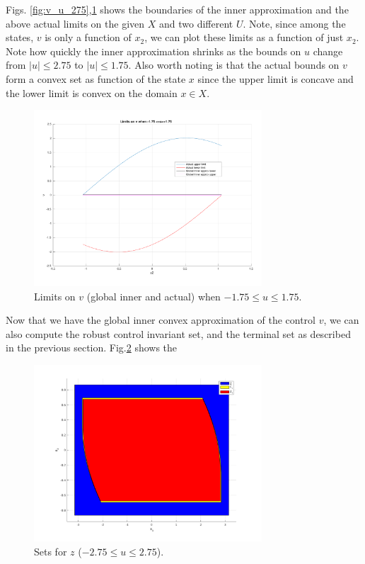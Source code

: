 \documentclass{article}[14pt]
\begin{document}
Figs. \ref{fig:v_u_275},\ref{fig:v_u_175} shows the boundaries of the inner approximation and the above actual limits on  the given $X$ and two different $U$. Note, since among the states, $v$ is only a function of $x_2$, we can plot these limits as a function of just $x_2$. Note how quickly the inner approximation shrinks as the bounds on $u$ change from $|u|\leq2.75$ to $|u|\leq1.75$. Also worth noting is that the actual bounds on $v$ form a convex set as function of the state $x$ since the upper limit is concave and the lower limit is convex on the domain $x\in X$.

\begin{figure}[tb]
	\centering
	\includegraphics[width=0.76\textwidth]{Figs/v_u_175.pdf}
	\vspace{-10pt}
	\caption{Limits on $v$ (global inner and actual) when $-1.75\leq u \leq 1.75$.}
	\label{fig:v_u_175}%
\end{figure} 

Now that we have the global inner convex approximation of the control $v$, we can also compute the robust control invariant set, and the terminal set as described in the previous section. Fig.\ref{fig:Z_states} shows the 

\begin{figure}[tb]
	\centering
	\includegraphics[width=0.76\textwidth]{Figs/Z_states.pdf}
	\vspace{-10pt}
	\caption{Sets for $z$ ($-2.75\leq u \leq 2.75$).}
	\label{fig:Z_states}%
\end{figure} 
\end{document}
